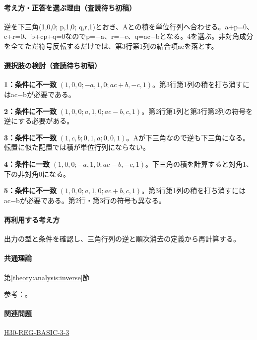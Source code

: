 \paragraph{考え方・正答を選ぶ理由（査読待ち初稿）} 逆を下三角(1,0,0; p,1,0; q,r,1)とおき、Aとの積を単位行列へ合わせる。a+p=\allowbreak{}0、c+r=\allowbreak{}0、b+cp+q=\allowbreak{}0なのでp=−a、r=−c、q=\allowbreak{}ac−bとなる。4を選ぶ。非対角成分を全てただ符号反転するだけでは、第3行第1列の結合項acを落とす。

\paragraph{選択肢の検討（査読待ち初稿）}\mbox{}\par

\noindent\textbf{1：条件に不一致} \((1,0,0;-a,1,0;ac+b,-c,1)\)。第3行第1列の積を打ち消すにはac−bが必要である。\par

\noindent\textbf{2：条件に不一致} \((1,0,0;a,1,0;ac-b,c,1)\)。第2行第1列と第3行第2列の符号を逆にする必要がある。\par

\noindent\textbf{3：条件に不一致} \((1,c,b;0,1,a;0,0,1)\)。Aが下三角なので逆も下三角になる。転置に似た配置では積が単位行列にならない。\par

\noindent\textbf{4：条件に一致} \((1,0,0;-a,1,0;ac-b,-c,1)\)。下三角の積を計算すると対角1、下の非対角0になる。\par

\noindent\textbf{5：条件に不一致} \((1,0,0;a,1,0;ac+b,c,1)\)。第3行第1列の積を打ち消すにはac−bが必要である。第2行・第3行の符号も異なる。\par

\paragraph{再利用する考え方} 出力の型と条件を確認し、三角行列の逆と順次消去の定義から再計算する。

\paragraph{共通理論} \hyperref[theory:analysis:inverse]{第\ref*{theory:analysis:inverse}節}

\par 参考：\cite{mit_inverse2007}。

\paragraph{関連問題} \hyperref[q:h30-reg-basic-3-3]{H30-REG-BASIC-3-3}

